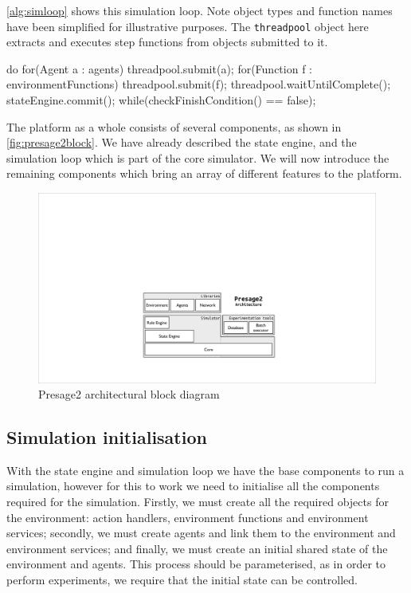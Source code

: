 \autoref{alg:simloop} shows this simulation loop. Note object types and function names have been simplified for illustrative purposes. The \texttt{threadpool} object here extracts and executes step functions from objects submitted to it.

\begin{java}[caption={Presage2 multi-threaded simulation loop},label=alg:simloop]
do {
	for(Agent a : agents) {
		threadpool.submit(a);
	}
	for(Function f : environmentFunctions) {
		threadpool.submit(f);
	}
	threadpool.waitUntilComplete();
	stateEngine.commit();
} while(checkFinishCondition() == false);
\end{java}

The platform as a whole consists of several components, as shown in
\autoref{fig:presage2block}. We have already described the state engine, and
the simulation loop which is part of the core simulator. We will now introduce
the remaining components which bring an array of different features to the
platform.

\begin{figure}[tb]
\includegraphics[width=\linewidth]{gfx/presage2/architecture_block}
\caption{Presage2 architectural block diagram}\label{fig:presage2block}
\end{figure}

\subsection{Simulation initialisation}

With the state engine and simulation loop we have the base components to run a
simulation, however for this to work we need to initialise all the
components required for the simulation. Firstly, we must create all the required
objects for the environment: action handlers, environment functions and
environment services; secondly, we must create agents and link them to the
environment and environment services; and finally, we must create an initial
shared state of the environment and agents. This process should be 
parameterised, as in order to perform experiments, we require that the initial state
can be controlled.

